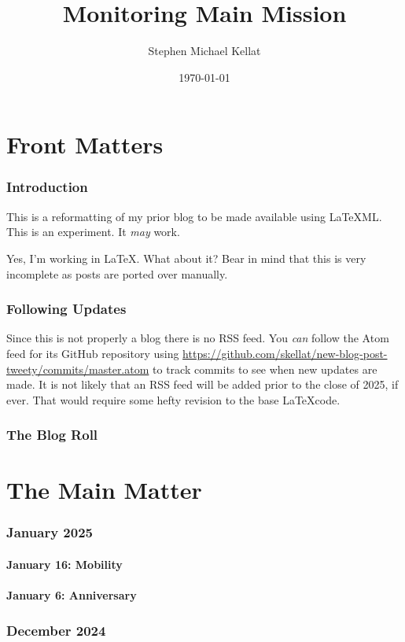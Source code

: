 \documentclass[12pt,letterpaper]{report}
\title{Monitoring Main Mission}
\author{Stephen Michael Kellat}
\date{\today}
\begin{document}
\maketitle
\tableofcontents
\part{Front Matters}
\section{Introduction}
This is a reformatting of my prior blog to be made available using LaTeXML.  This is an experiment.  It \emph{may} work.  

Yes, I'm working in \LaTeX.  What about it?  Bear in mind that this is very incomplete as posts are ported over manually.
\section{Following Updates}
Since this is not properly a blog there is no RSS feed.  You \emph{can} follow the Atom feed for its GitHub repository using \url{https://github.com/skellat/new-blog-post-tweety/commits/master.atom} to track commits to see when new updates are made.  It is not likely that an RSS feed will be added prior to the close of 2025, if ever.  That would require some hefty revision to the base \LaTeX code.
\section{The Blog Roll}

\part{The Main Matter}
\section{January 2025}
\subsection{January 16: Mobility}

\subsection{January 6: Anniversary}

\section{December 2024}
\end{document}
